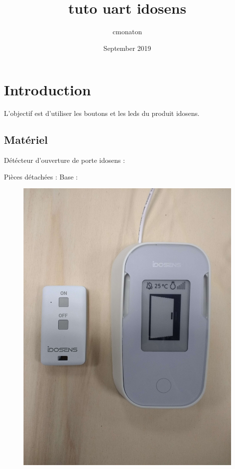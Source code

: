 \documentclass{article}
\title{tuto uart idosens}
\author{cmonaton }
\date{September 2019}
\begin{document}
\maketitle

\section{Introduction}
L'objectif est d'utiliser les boutons et les leds du produit idosens.

\subsection{Matériel}
Détécteur d'ouverture de porte idosens :


Pièces détachées :
Base :








\begin{figure}[H]
\begin{center}
\advance\leftskip-3cm
\advance\rightskip-3cm
\includegraphics[keepaspectratio=true,scale=0.05]{produit_complet.jpg}
\label{visina8}
\end{center}\end{figure}
\end{document}
